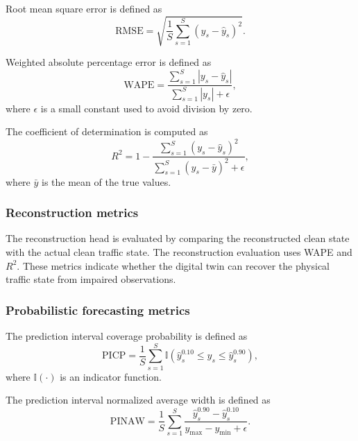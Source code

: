 \documentclass[pdflatex,sn-mathphys-num]{sn-jnl}%
\theoremstyle{thmstyleone}%
\theoremstyle{thmstyletwo}%
\theoremstyle{thmstylethree}%
\begin{document}
Root mean square error is defined as
\begin{equation}
    \mathrm{RMSE}
    =
    \sqrt{
    \frac{1}{S}
    \sum_{s=1}^{S}
    \left(
    y_s - \widehat{y}_s
    \right)^2
    }.
\end{equation}

Weighted absolute percentage error is defined as
\begin{equation}
    \mathrm{WAPE}
    =
    \frac{
    \sum_{s=1}^{S}
    \left|
    y_s - \widehat{y}_s
    \right|
    }{
    \sum_{s=1}^{S}
    \left|
    y_s
    \right|
    +
    \epsilon
    },
\end{equation}
where \(\epsilon\) is a small constant used to avoid division by zero.

The coefficient of determination is computed as
\begin{equation}
    R^{2}
    =
    1
    -
    \frac{
    \sum_{s=1}^{S}
    \left(
    y_s - \widehat{y}_s
    \right)^2
    }{
    \sum_{s=1}^{S}
    \left(
    y_s - \bar{y}
    \right)^2
    +
    \epsilon
    },
\end{equation}
where \(\bar{y}\) is the mean of the true values.

\subsubsection{Reconstruction metrics}

The reconstruction head is evaluated by comparing the reconstructed clean state with the actual clean traffic state. The reconstruction evaluation uses WAPE and \(R^{2}\). These metrics indicate whether the digital twin can recover the physical traffic state from impaired observations.

\subsubsection{Probabilistic forecasting metrics}

The prediction interval coverage probability is defined as
\begin{equation}
    \mathrm{PICP}
    =
    \frac{1}{S}
    \sum_{s=1}^{S}
    \mathbb{I}
    \left(
    \widehat{y}_{s}^{0.10}
    \leq
    y_s
    \leq
    \widehat{y}_{s}^{0.90}
    \right),
\end{equation}
where \(\mathbb{I}(\cdot)\) is an indicator function.

The prediction interval normalized average width is defined as
\begin{equation}
    \mathrm{PINAW}
    =
    \frac{1}{S}
    \sum_{s=1}^{S}
    \frac{
    \widehat{y}_{s}^{0.90}
    -
    \widehat{y}_{s}^{0.10}
    }{
    y_{\max} - y_{\min} + \epsilon
    }.
\end{equation}
\end{document}
